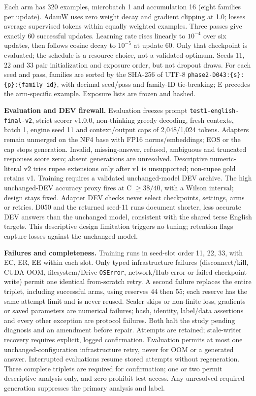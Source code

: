 Each arm has 320 examples, microbatch 1 and accumulation 16 (eight families per update). AdamW uses zero weight decay and gradient clipping at 1.0; losses average supervised tokens within equally weighted examples. Three passes give exactly 60 successful updates. Learning rate rises linearly to $10^{-4}$ over six updates, then follows cosine decay to $10^{-5}$ at update 60. Only that checkpoint is evaluated; the schedule is a resource choice, not a validated optimum. Seeds 11, 22 and 33 pair initialization and exposure order, but not dropout draws. For each seed and pass, families are sorted by the SHA-256 of UTF-8 \texttt{phase2-D043:\{s\}:\{p\}:\{family\_id\}}, with decimal seed/pass and family-ID tie-breaking; E precedes the arm-specific example. Exposure lists are frozen and hashed.

\noindent\textbf{Evaluation and DEV firewall.} Evaluation freezes prompt \texttt{test1-english-final-v2}, strict scorer v1.0.0, non-thinking greedy decoding, fresh contexts, batch 1, engine seed 11 and context/output caps of 2,048/1,024 tokens. Adapters remain unmerged on the NF4 base with FP16 norms/embeddings; EOS or the cap stops generation. Invalid, missing-answer, refused, ambiguous and truncated responses score zero; absent generations are unresolved. Descriptive numeric-literal v2 tries rupee extensions only after v1 is unsupported; non-rupee gold retains v1. Training requires a validated unchanged-model DEV archive. The high unchanged-DEV accuracy proxy fires at C $\geq38/40$, with a Wilson interval; design stays fixed. Adapter DEV checks never select checkpoints, settings, arms or retries. D050 and the returned seed-11 runs document shorter, less accurate DEV answers than the unchanged model, consistent with the shared terse English targets. This descriptive design limitation triggers no tuning; retention flags capture losses against the unchanged model.

\noindent\textbf{Failures and completeness.} Training runs in seed-slot order 11, 22, 33, with EC, ER, EE within each slot. Only typed infrastructure failures (disconnect/kill, CUDA OOM, filesystem/Drive \texttt{OSError}, network/Hub error or failed checkpoint write) permit one identical from-scratch retry. A second failure replaces the entire triplet, including successful arms, using reserves 44 then 55; each reserve has the same attempt limit and is never reused. Scaler skips or non-finite loss, gradients or saved parameters are numerical failures; hash, identity, label/data assertions and every other exception are protocol failures. Both halt the study pending diagnosis and an amendment before repair. Attempts are retained; stale-writer recovery requires explicit, logged confirmation. Evaluation permits at most one unchanged-configuration infrastructure retry, never for OOM or a generated answer. Interrupted evaluations resume stored attempts without regeneration. Three complete triplets are required for confirmation; one or two permit descriptive analysis only, and zero prohibit test access. Any unresolved required generation suppresses the primary analysis and label.

